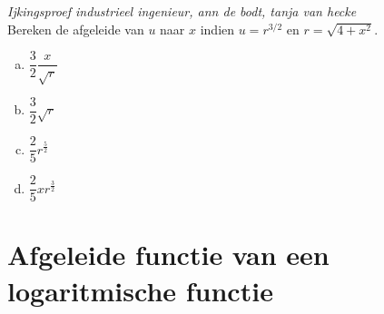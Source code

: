 \documentclass[12pt]{article}
\begin{document}
\begin{oefening}
{\em \scriptsize Ijkingsproef industrieel ingenieur, ann de bodt, tanja van hecke}\\
Bereken de afgeleide van $u$ naar $x$ indien $u=r^{3/2}$ en $r=\sqrt{4+x^2}$.
\begin{enumerate}[(a)]
  \itemsep.3em
  \item $\dfrac{3}{2}\dfrac{x}{\sqrt{r}}$
  \item $\dfrac{3}{2}\sqrt{r}$
  \item $\dfrac{2}{5}r^\frac{5}{2}$
  \item $\dfrac{2}{5}xr^\frac{3}{2}$
\end{enumerate}
\end{oefening}

\pagebreak
\section{Afgeleide functie van een logaritmische functie}
\end{document}
